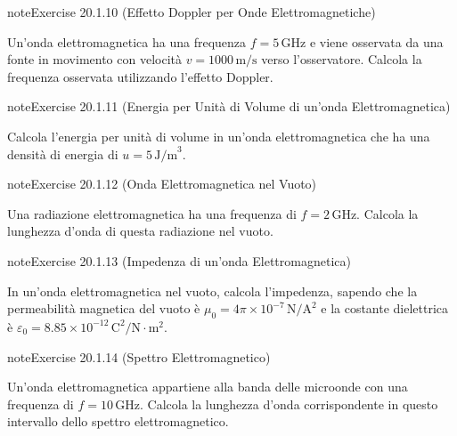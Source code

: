 \documentclass[letterpaper,10pt,italian]{jupyterBook}
\begin{document}
\begin{sphinxadmonition}{note}{Exercise 20.1.10 (Effetto Doppler per Onde Elettromagnetiche)}



\sphinxAtStartPar
Un’onda elettromagnetica ha una frequenza \(f = 5 \, \text{GHz}\) e viene osservata da una fonte in movimento con velocità \(v = 1000 \, \text{m/s}\) verso l’osservatore. Calcola la frequenza osservata utilizzando l’effetto Doppler.
\end{sphinxadmonition}
 \label{exercise:ch/electromagnetism/em-waves-problems-exercise-10}

\begin{sphinxadmonition}{note}{Exercise 20.1.11 (Energia per Unità di Volume di un’onda Elettromagnetica)}



\sphinxAtStartPar
Calcola l’energia per unità di volume in un’onda elettromagnetica che ha una densità di energia di \(u = 5 \, \text{J/m}^3\).
\end{sphinxadmonition}
 \label{exercise:ch/electromagnetism/em-waves-problems-exercise-11}

\begin{sphinxadmonition}{note}{Exercise 20.1.12 (Onda Elettromagnetica nel Vuoto)}



\sphinxAtStartPar
Una radiazione elettromagnetica ha una frequenza di \(f = 2 \, \text{GHz}\). Calcola la lunghezza d’onda di questa radiazione nel vuoto.
\end{sphinxadmonition}
 \label{exercise:ch/electromagnetism/em-waves-problems-exercise-12}

\begin{sphinxadmonition}{note}{Exercise 20.1.13 (Impedenza di un’onda Elettromagnetica)}



\sphinxAtStartPar
In un’onda elettromagnetica nel vuoto, calcola l’impedenza, sapendo che la permeabilità magnetica del vuoto è \(\mu_0 = 4\pi \times 10^{-7} \, \text{N}/\text{A}^2\) e la costante dielettrica è \(\varepsilon_0 = 8.85 \times 10^{-12} \, \text{C}^2/\text{N} \cdot \text{m}^2\).
\end{sphinxadmonition}
 \label{exercise:ch/electromagnetism/em-waves-problems-exercise-13}

\begin{sphinxadmonition}{note}{Exercise 20.1.14 (Spettro Elettromagnetico)}



\sphinxAtStartPar
Un’onda elettromagnetica appartiene alla banda delle microonde con una frequenza di \(f = 10 \, \text{GHz}\). Calcola la lunghezza d’onda corrispondente in questo intervallo dello spettro elettromagnetico.
\end{sphinxadmonition}
 \label{exercise:ch/electromagnetism/em-waves-problems-exercise-14}
\end{document}
